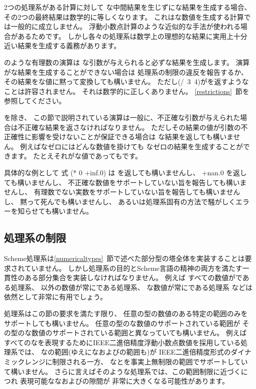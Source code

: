 \vest 2つの処理系がある計算に対して
な中間結果を生じずにな結果を生成する場合、
その2つの最終結果は数学的に等しくなります。
これはな数値を生成する計算では一般的に成立しません。
浮動小数点計算のような近似的な手法が使われる場合があるためです。
しかし各々の処理系は数学上の理想的な結果に実用上十分近い結果を生成する義務があります。

\vest {\cf +} のような有理数の演算は
な引数が与えられると必ずな結果を生成します。
演算がな結果を生成することができない場合は
処理系の制限の違反を報告するか、
その結果をな値に黙って変換しても構いません。
ただし{\cf (/~3~4)}が{}を返すようなことは許容されません。
それは数学的に正しくありません。
\ref{restrictions}~節を参照してください。

\vest {}を除き、
この節で説明されている演算は一般に、不正確な引数が与えられた場合は不正確な結果を返さなければなりません。
ただしその結果の値が引数の不正確性に影響を受けないことが保証できる場合は
な結果を返しても構いません。
例えばなゼロにはどんな数値を掛けても
なゼロの結果を生成することができます。
たとえそれがな値であってもです。

具体的な例として
式 {\cf (* 0 +inf.0)} は
{}を返しても構いませんし、
{\cf +nan.0} を返しても構いませんし、
不正確な数値をサポートしていない旨を報告しても構いませんし、
有理数でない実数をサポートしていない旨を報告しても構いませんし、
黙って死んでも構いませんし、
あるいは処理系固有の方法で騒がしくエラーを知らせても構いません。

\subsection{処理系の制限}

\label{restrictions}

\vest Scheme処理系は\ref{numericaltypes}~節で述べた部分型の塔全体を実装することは要求されていません。
しかし処理系の目的とScheme言語の精神の両方を満たす一貫性のある部分集合を実装しなければなりません。
例えば
すべての数値がである処理系、
以外の数値が常にである処理系、
な数値が常にである処理系
などは依然として非常に有用でしょう。

\vest 処理系はこの節の要求を満たす限り、
任意の型の数値のある特定の範囲のみをサポートしても構いません。
任意の型のな数値のサポートされている範囲が
その型のな数値のサポートされている範囲と異なっていても構いません。
例えば
すべてのなを表現するためにIEEE二進倍精度浮動小数点数値を採用している処理系では、
なの範囲(ゆえになおよびの範囲も)が
IEEE二進倍精度形式のダイナミックレンジに制限される一方、
なとを事実上無制限の範囲でサポートしていて構いません。
さらに言えばそのような処理系では、この範囲制限に近づくにつれ
表現可能ななおよびの隙間が
非常に大きくなる可能性があります。

